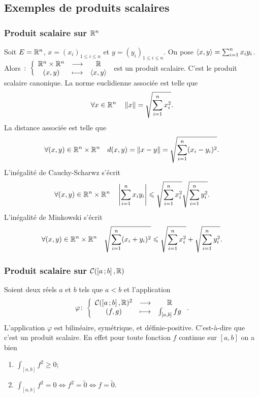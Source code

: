 \subsection{Exemples de produits scalaires}

\subsubsection{Produit scalaire sur $\mathbb{R}^n$}

Soit $E=\mathbb{R}^n$, $x=(x_i)_{1\le i\leqslant n}$ et $y=(y_i)_{1\le i\leqslant n}$. On pose $\left\langle{x},{y}\right\rangle=\sum_{i=1}^n x_iy_i$. Alors $\colon \left\{\begin{array}{ccc} \mathbb{R}^n\times\mathbb{R}^n & \longrightarrow &\mathbb{R}\\ (x,y) & \longmapsto & \left\langle{x},{y}\right\rangle \end{array} \right.$ est un produit scalaire. C'est le produit scalaire canonique. La norme euclidienne associée est telle que
\begin{equation}
  \forall x \in \mathbb{R}^n \quad \left\lVert x\right\rVert = \sqrt{\sum_{i=1}^n x_i^2}.
\end{equation}
La distance associée est telle que
\begin{equation}
  \forall (x,y) \in \mathbb{R}^n\times\mathbb{R}^n \quad d(x,y)=\left\lVert x-y\right\rVert = \sqrt{\sum_{i=1}^n (x_i-y_i)^2}.
\end{equation}
L'inégalité de Cauchy-Scharwz s'écrit
\begin{equation}
  \forall (x,y) \in \mathbb{R}^n\times\mathbb{R}^n \quad \left\lvert\sum_{i=1}^n x_iy_i\right\rvert \leqslant \sqrt{\sum_{i=1}^n x_i^2} \sqrt{\sum_{i=1}^n y_i^2}.
\end{equation}
L'inégalité de Minkowski s'écrit
\begin{equation}
  \forall (x,y) \in \mathbb{R}^n\times\mathbb{R}^n \quad \sqrt{\sum_{i=1}^n (x_i+y_i)^2} \leqslant \sqrt{\sum_{i=1}^n x_i^2}+ \sqrt{\sum_{i=1}^n y_i^2}.
\end{equation}

\subsubsection{Produit scalaire sur $\mathcal{C}(\left[ a \, ;  b \right],\mathbb{R})$}

Soient deux réels $a$ et $b$ tels que $a<b$ et l'application
\begin{equation}
  \varphi\colon \left\{\begin{array}{ccc} \mathcal{C}(\left[ a \, ;  b \right],\mathbb{R})^2 & \longrightarrow &\mathbb{R}\\ (f,g) & \longmapsto & \int_{[a,b]}fg \end{array} \right..
\end{equation}
L'application $\varphi$ est bilinéaire, symétrique, et définie-positive. C'est-à-dire que c'est un produit scalaire. En effet pour toute fonction $f$ continue sur $[a,b]$ on a bien
\begin{enumerate}
\item $\int_{[a,b]}f^2 \geqslant 0$;
\item $\int_{[a,b]}f^2 = 0 \iff f^2=\tilde{0} \iff f=\tilde{0}$.
\end{enumerate}


